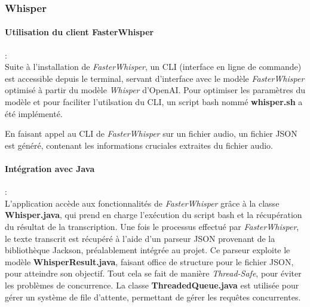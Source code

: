 \subsubsection{Whisper}
\label{sec:whisperImpl}

\paragraph*{Utilisation du client FasterWhisper} : \\
Suite à l'installation de \textit{FasterWhisper}, un CLI (interface en ligne de
commande) est accessible depuis le terminal, servant d'interface avec le modèle
\textit{FasterWhisper} optimisé à partir du modèle \textit{Whisper} d'OpenAI.
Pour optimiser les paramètres du modèle et pour faciliter l'utilsation du CLI,
un script bash nommé \textbf{whisper.sh} a été implémenté.

En faisant appel au CLI de \textit{FasterWhisper} sur un fichier audio, un fichier JSON est généré, contenant les
informations cruciales extraites du fichier audio.

\paragraph*{Intégration avec Java}: \\
L'application accède aux fonctionnalités de \textit{FasterWhisper} grâce à la
classe \textbf{Whisper.java}, qui prend en charge l'exécution du script bash et
la récupération du résultat de la transcription. Une fois le processus effectué
par \textit{FasterWhisper}, le texte transcrit est récupéré à l'aide d'un
parseur JSON provenant de la bibliothèque Jackson, préalablement intégrée au
projet. Ce parseur exploite le modèle \textbf{WhisperResult.java}, faisant
office de structure pour le fichier JSON, pour atteindre son objectif. Tout
cela se fait de manière \textit{Thread-Safe}, pour éviter les problèmes de
concurrence. La classe \textbf{ThreadedQueue.java} est utilisée pour gérer un
système de file d'attente, permettant de gérer les requêtes concurrentes.
